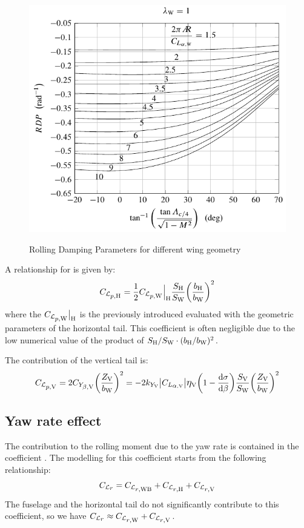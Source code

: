 \begin{figure}[H]
	{\includegraphics[width=.5\textwidth]{Immagini/Capitolo2/4_81-RDP_lam1}}
\caption[Rolling Damping Parameters] {Rolling Damping Parameters for different wing geometry}
\label{rollingdampingparameters}
\end{figure}

A relationship for \CLprateH is given by:
\begin{equation}
\label{eq:rollrollrateH}
\CLprateH = \frac{1}{2} \CLprateW \Big|_{\textrm H} \frac{\SH}{\SW} \biggl( \frac{\bH}{\bW} \biggr)^2
\end{equation}
where the $\CLprateW \big|_{\textrm  H}$ is the previously introduced \CLprateW evaluated with the geometric parameters of the horizontal tail. This coefficient is often negligible due to the low numerical value of the product of $\SH / \SW \cdot (\bH / \bW)^2$.

The contribution of the vertical tail is:
\begin{equation}
\label{eq:rollrollrateV}
\CLprateV = 2 \CYbetaV \biggl( \frac{\ZV}{\bW} \biggr)^2 = - 2  k_{Y_\textrm V}  \big|\CLalphaV \big| \etaV \biggl( 1 - \frac{\mathrm{d}\sigma}{\mathrm{d}\beta} \biggr) \frac{\SV}{\SW} \biggl( \frac{\ZV}{\bW} \biggr)^2
\end{equation}

\subsection{Yaw rate effect}
\label{subsec2.5.2}

The contribution to the rolling moment due to the yaw rate is contained in the coefficient \CLrrate. The modelling for this coefficient starts from the following relationship:
\begin{equation}
\label{eq:rollyawrate}
\CLrrate = \CLrrateWB + \CLrrateH + \CLrrateV
\end{equation}
The fuselage and the horizontal tail do not significantly contribute to this coefficient, so we have $\CLrrate \approx \CLrrateW + \CLrrateV$.

